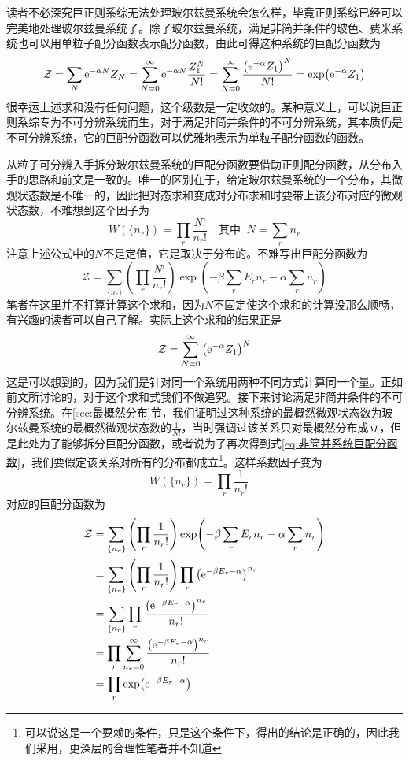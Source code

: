 \documentclass[../../main.tex]{subfiles}
\begin{document}
读者不必深究巨正则系综无法处理玻尔兹曼系统会怎么样，毕竟正则系综已经可以完美地处理玻尔兹曼系统了。除了玻尔兹曼系统，满足非简并条件的玻色、费米系统也可以用单粒子配分函数表示配分函数，由此可得这种系统的巨配分函数为
\begin{equation}\label{eq:非简并系统巨配分函数}
    \mathcal{Z}=\sum_N \mathrm{e}^{-\alpha N}Z_N=\sum_{N=0}^{\infty} \mathrm{e}^{-\alpha N}\frac{Z_1^N}{N!}=\sum_{N=0}^{\infty} \frac{\big(\mathrm{e}^{-\alpha}Z_1\big)^N}{N!}=\exp(\mathrm{e}^{-\alpha}Z_1)
\end{equation}
很幸运上述求和没有任何问题，这个级数是一定收敛的。某种意义上，可以说巨正则系综专为不可分辨系统而生，对于满足非简并条件的不可分辨系统，其本质仍是不可分辨系统，它的巨配分函数可以优雅地表示为单粒子配分函数的函数。

从粒子可分辨入手拆分玻尔兹曼系统的巨配分函数要借助正则配分函数，从分布入手的思路和前文是一致的。唯一的区别在于，给定玻尔兹曼系统的一个分布，其微观状态数是不唯一的，因此把对态求和变成对分布求和时要带上该分布对应的微观状态数，不难想到这个因子为
\begin{equation}
    W(\{n_r\})=\prod_r \frac{N!}{n_r!}\quad \text{其中}\;\; N=\sum_r n_r
\end{equation}
注意上述公式中的\(N\)不是定值，它是取决于分布的。不难写出巨配分函数为
\begin{equation}
    \mathcal{Z}=\sum_{\{n_r\}}\left(\prod_r \frac{N!}{n_r!}\right)\exp(-\beta\sum_r E_rn_r-\alpha\sum_r n_r)
\end{equation}
笔者在这里并不打算计算这个求和，因为\(N\)不固定使这个求和的计算没那么顺畅，有兴趣的读者可以自己了解。实际上这个求和的结果正是
\begin{equation}
    \mathcal{Z}=\sum_{N=0}^{\infty} \big(\mathrm{e}^{-\alpha}Z_1\big)^N
\end{equation}
这是可以想到的，因为我们是针对同一个系统用两种不同方式计算同一个量。正如前文所讨论的，对于这个求和式我们不做追究。接下来讨论满足非简并条件的不可分辨系统。在\ref{sec:最概然分布}节，我们证明过这种系统的最概然微观状态数为玻尔兹曼系统的最概然微观状态数的\(\frac{1}{N!}\)，当时强调过该关系只对最概然分布成立，但是此处为了能够拆分巨配分函数，或者说为了再次得到式\eqref{eq:非简并系统巨配分函数}，我们要假定该关系对所有的分布都成立\footnote{可以说这是一个耍赖的条件，只是这个条件下，得出的结论是正确的，因此我们采用，更深层的合理性笔者并不知道}。这样系数因子变为
\begin{equation}
    W(\{n_r\})=\prod_r \frac{1}{n_r!}\quad
\end{equation}
对应的巨配分函数为
\begin{equation}
    \begin{split}
        \mathcal{Z}&=\sum_{\{n_r\}}\left(\prod_r \frac{1}{n_r!}\right)\exp(-\beta\sum_r E_rn_r-\alpha\sum_r n_r) \\
        &=\sum_{\{n_r\}}\left(\prod_r \frac{1}{n_r!}\right)\prod_r\left(\mathrm{e}^{-\beta E_r-\alpha}\right)^{n_r} \\
        &=\sum_{\{n_r\}}\prod_r \frac{\left(\mathrm{e}^{-\beta E_r-\alpha}\right)^{n_r}}{n_r!} \\
        &=\prod_r \sum_{n_r=0}^{\infty}\frac{\left(\mathrm{e}^{-\beta E_r-\alpha}\right)^{n_r}}{n_r!}\quad  \\
        &=\prod_r \exp(\mathrm{e}^{-\beta E_r-\alpha})
    \end{split}
\end{equation}
\end{document}
